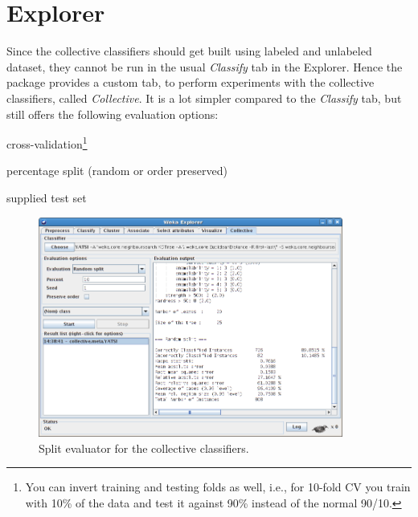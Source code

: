 \documentclass[a4paper]{book}
\begin{document}
\chapter{Explorer}
Since the collective classifiers should get built using labeled and unlabeled
dataset, they cannot be run in the usual \textit{Classify} tab in the Explorer. 
Hence the package provides a custom tab, to perform experiments with the 
collective classifiers, called \textit{Collective}. It is a lot simpler compared
to the \textit{Classify} tab, but still offers the following evaluation options:
\begin{tight_itemize}
	\item cross-validation\footnote{You can invert training and testing folds
	as well, i.e., for 10-fold CV you train with 10\% of the data and test it
	against 90\% instead of the normal 90/10.}
	\item percentage split (random or order preserved)
	\item supplied test set
\end{tight_itemize}
\begin{figure}[htb]
  \centering
  \includegraphics[width=10.0cm]{images/explorer-split.png}
  \caption{Split evaluator for the collective classifiers.}
  \label{explorer-split}
\end{figure}

\end{document}
